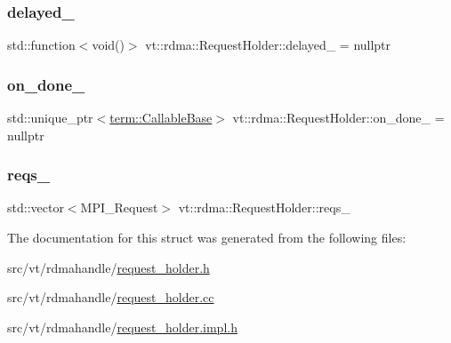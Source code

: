 \subsubsection{\texorpdfstring{delayed\+\_\+}{delayed\_}}
{\footnotesize\ttfamily std\+::function$<$void()$>$ vt\+::rdma\+::\+Request\+Holder\+::delayed\+\_\+ = nullptr\hspace{0.3cm}{\ttfamily [private]}}

\mbox{\label{structvt_1_1rdma_1_1_request_holder_ac10cdebd8a619357fe95b1abaea3bc6d}} 
\subsubsection{\texorpdfstring{on\+\_\+done\+\_\+}{on\_done\_}}
{\footnotesize\ttfamily std\+::unique\+\_\+ptr$<$\hyperlink{structvt_1_1term_1_1_callable_base}{term\+::\+Callable\+Base}$>$ vt\+::rdma\+::\+Request\+Holder\+::on\+\_\+done\+\_\+ = nullptr\hspace{0.3cm}{\ttfamily [private]}}

\mbox{\label{structvt_1_1rdma_1_1_request_holder_ab2c38a29749f7704a49786851d947571}} 
\subsubsection{\texorpdfstring{reqs\+\_\+}{reqs\_}}
{\footnotesize\ttfamily std\+::vector$<$M\+P\+I\+\_\+\+Request$>$ vt\+::rdma\+::\+Request\+Holder\+::reqs\+\_\+\hspace{0.3cm}{\ttfamily [private]}}



The documentation for this struct was generated from the following files\+:\begin{DoxyCompactItemize}
\item 
src/vt/rdmahandle/\hyperlink{rdmahandle_2request__holder_8h}{request\+\_\+holder.\+h}\item 
src/vt/rdmahandle/\hyperlink{request__holder_8cc}{request\+\_\+holder.\+cc}\item 
src/vt/rdmahandle/\hyperlink{request__holder_8impl_8h}{request\+\_\+holder.\+impl.\+h}\end{DoxyCompactItemize}
